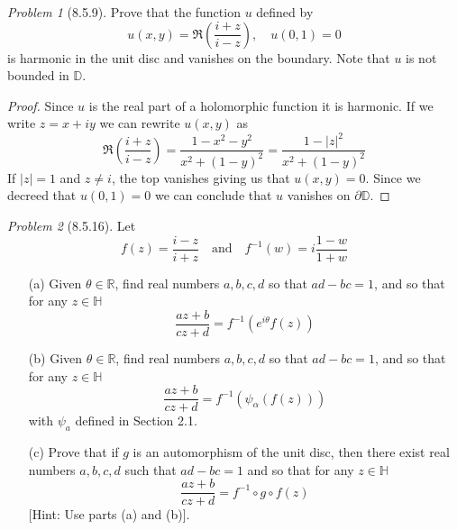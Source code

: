 \documentclass[10pt]{article}
\newcommand{\sk}{\vskip 10mm}
\newcommand{\bb}[1]{\mathbb{#1}}
\theoremstyle{remark}
\newtheorem{problem}{Problem}
\theoremstyle{remark}
\begin{document}
\begin{problem}[8.5.9]
  Prove that the function $u$ defined by
  \[
    u(x,y)=\Re(\frac{i+z}{i-z}),\quad u(0,1)=0
  \]
  is harmonic in the unit disc and vanishes on the boundary. Note that
  $u$ is not bounded in $\bb{D}$.
\end{problem}

\begin{proof}
  Since $u$ is the real part of a holomorphic function it is harmonic. If
  we write $z=x+iy$ we can rewrite $u(x,y)$ as
  \[
    \Re(\frac{i+z}{i-z})=\frac{1-x^2-y^2}{x^2+(1-y)^2}=\frac{1-|z|^2}{x^2+(1-y)^2}
  \]
  If $|z|=1$ and $z\neq i$, the top vanishes giving us that $u(x,y)=0$.
  Since we decreed that $u(0,1)=0$ we can conclude that $u$ vanishes
  on $\partial\bb{D}$.
\end{proof}

\sk

\begin{problem}[8.5.16]
  Let
  \[
    f(z)=\frac{i-z}{i+z}\quad\text{and}\quad f^{-1}(w)=i\frac{1-w}{1+w}
  \]
  \begin{enumerate}
  \item[(a)] Given $\theta\in\bb{R}$, find real numbers $a,b,c,d$ so that
    $ad-bc=1$, and so that for any $z\in\bb{H}$
    \[
      \frac{az+b}{cz+d}=f^{-1}(e^{i\theta}f(z))
    \]
  \item[(b)] Given $\theta\in\bb{R}$, find real numbers $a,b,c,d$ so that
    $ad-bc=1$, and so that for any $z\in\bb{H}$
    \[
      \frac{az+b}{cz+d}=f^{-1}(\psi_\alpha(f(z)))
    \]
    with $\psi_a$ defined in Section 2.1.
  \item[(c)] Prove that if $g$ is an automorphism of the unit disc, then there
    exist real numbers $a,b,c,d$ such that $ad-bc=1$ and so that for any
    $z\in\bb{H}$
    \[
      \frac{az+b}{cz+d}=f^{-1}\circ g\circ f(z)
    \]
    [Hint: Use parts (a) and (b)].
  \end{enumerate}
\end{problem}
\end{document}
